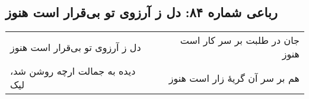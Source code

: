 \begin{center}
\section*{رباعی شماره ۸۴: دل ز آرزوی تو بی‌قرار است هنوز}
\label{sec:084}
\begin{longtable}{l p{0.5cm} r}
دل ز آرزوی تو بی‌قرار است هنوز
&&
جان در طلبت بر سر کار است هنوز
\\
دیده به جمالت ارچه روشن شد، لیک
&&
هم بر سر آن گریهٔ زار است هنوز
\\
\end{longtable}
\end{center}
